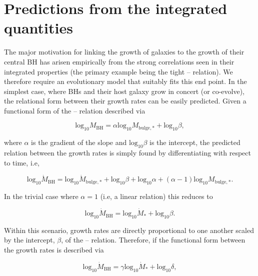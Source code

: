 \appendix

\section{Predictions from the integrated quantities}
\label{sect:motivation}

The major motivation for linking the growth of galaxies to the growth of their
central BH has arisen empirically from the strong correlations seen in their
integrated properties (the primary example being the tight --
relation).  We therefore require an evolutionary model that suitably fits this
end point.  In the simplest case, where BHs and their host galaxy grow in
concert (or co-evolve), the relational form between their growth rates can be
easily predicted.  Given a functional form of the -- relation
described via

\begin{equation} \mathrm{log}_{10} M_{\mathrm{BH}} = \alpha \mathrm{log}_{10}
M_{\mathrm{bulge,*}} + \mathrm{log}_{10} \beta, \label{eq:slope1}
\end{equation}

\noindent where $\alpha$ is the gradient of the slope and $\mathrm{log}_{10}
\beta$ is the intercept, the predicted relation between the growth rates is
simply found by differentiating with respect to time, i.e,

\begin{equation} \mathrm{log}_{10} \dot M_{\mathrm{BH}} = \mathrm{log}_{10}
\dot M_{\mathrm{bulge,*}} + \mathrm{log}_{10} \beta + \mathrm{log}_{10} \alpha
+ (\alpha -1) \mathrm{log}_{10} M_{\mathrm{bulge,*}} .  \label{eq:slope2}
\end{equation}

\noindent In the trivial case where $\alpha = 1$ (i.e, a linear relation)
this reduces to

\begin{equation} \mathrm{log}_{10} \dot M_{\mathrm{BH}} = \mathrm{log}_{10}
\dot M_{\mathrm{*}} + \mathrm{log}_{10} \beta.  \label{eq:slope3}
\end{equation}

\noindent Within this scenario, growth rates are directly proportional to one
another scaled by the intercept, $\beta$, of the -- relation.
Therefore, if the functional form between the growth rates is described via

\begin{equation} \mathrm{log}_{10} \dot M_{\mathrm{BH}} = \gamma
\mathrm{log}_{10} \dot M_{*} + \mathrm{log}_{10} \delta, \label{eq:slope4}
\end{equation}

